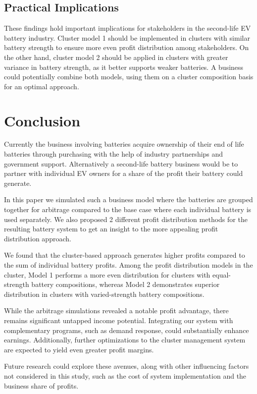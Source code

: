 \documentclass[conference]{IEEEtran}
\begin{document}
\subsection{Practical Implications}

These findings hold important implications for stakeholders in the second-life EV battery industry. Cluster model 1 should be implemented in clusters with similar battery strength to ensure more even profit distribution among stakeholders. On the other hand, cluster model 2 should be applied in clusters with greater variance in battery strength, as it better supports weaker batteries. A business could potentially combine both models, using them on a cluster composition basis for an optimal approach.

\section{Conclusion}

Currently the business involving batteries acquire ownership of their end of life batteries through purchasing with the help of industry partnerships and government support. Alternatively a second-life battery business would be to partner with individual EV owners for a share of the profit their battery could generate.

In this paper we simulated such a business model where the batteries are grouped together for arbitrage compared to the base case where each individual battery is used separately. We also proposed 2 different profit distribution methods for the resulting battery system to get an insight to the more appealing profit distribution approach.

We found that the cluster-based approach generates higher profits compared to the sum of individual battery profits. Among the profit distribution models in the cluster, Model 1 performs a more even distribution for clusters with equal-strength battery compositions, whereas Model 2 demonstrates superior distribution in clusters with varied-strength battery compositions.

While the arbitrage simulations revealed a notable profit advantage, there remains significant untapped income potential. Integrating our system with complementary programs, such as demand response, could substantially enhance earnings. Additionally, further optimizations to the cluster management system are expected to yield even greater profit margins.

Future research could explore these avenues, along with other influencing factors not considered in this study, such as the cost of system implementation and the business share of profits.
\end{document}
